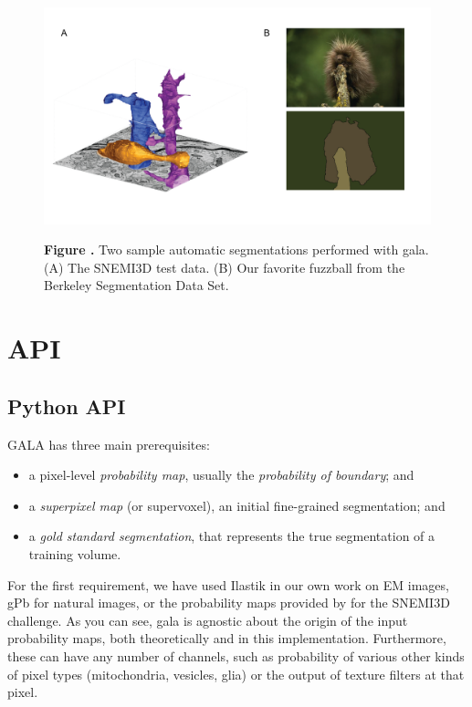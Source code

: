 \documentclass{frontiersSCNS} %
\begin{document}
\begin{figure}
\begin{center}
\includegraphics[width=18cm]{figure1}
\end{center}
 \textbf{\label{fig:01} Figure .}{ Two sample automatic segmentations performed with gala. (A) The SNEMI3D test data. (B) Our favorite fuzzball from the Berkeley Segmentation Data Set. }
\end{figure}


\section{API}


\subsection{Python API}

GALA has three main prerequisites:
\begin{itemize}
\item a pixel-level \emph{probability map}, usually the \emph{probability of boundary}; and
\item a \emph{superpixel map} (or supervoxel), an initial fine-grained segmentation; and
\item a \emph{gold standard segmentation}, that represents the true segmentation of a training volume.
\end{itemize}

For the first requirement, we have used Ilastik \citep{ilastik} in our own work on EM images, gPb \citep{globalpb} for natural images, or the probability maps provided by \cite{Ciresan:2012vi} for the SNEMI3D challenge.
As you can see, gala is agnostic about the origin of the input probability maps, both theoretically and in this implementation.
Furthermore, these can have any number of channels, such as probability of various other kinds of pixel types (mitochondria, vesicles, glia) or the output of texture filters at that pixel.
\end{document}
